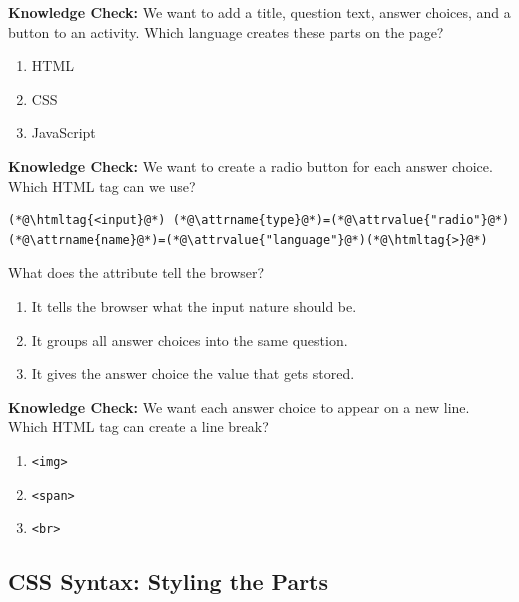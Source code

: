 \documentclass{article}
\begin{document}
\vspace{0.5cm}

\textbf{Knowledge Check:} We want to add a title, question text, answer choices, and a button to an activity. Which language creates these parts on the page?

\begin{enumerate}[label=\Alph*), topsep=4pt, itemsep=2pt, partopsep=0pt]
  \item HTML
  \item CSS
  \item JavaScript
\end{enumerate}

\vspace{0.5cm}

\textbf{Knowledge Check:} We want to create a radio button for each answer choice. Which HTML tag can we use?

\begin{lstlisting}
(*@\htmltag{<input}@*) (*@\attrname{type}@*)=(*@\attrvalue{"radio"}@*) (*@\attrname{name}@*)=(*@\attrvalue{"language"}@*)(*@\htmltag{>}@*)
\end{lstlisting}

What does the  attribute tell the browser?
\begin{enumerate}[label=\Alph*), topsep=4pt, itemsep=2pt, partopsep=0pt]
  \item It tells the browser what the input nature should be.
  \item It groups all answer choices into the same question.
  \item It gives the answer choice the value that gets stored.
\end{enumerate}

\vspace{0.5cm}

\textbf{Knowledge Check:} We want each answer choice to appear on a new line. Which HTML tag can create a line break?

\begin{enumerate}[label=\Alph*), topsep=4pt, itemsep=2pt, partopsep=0pt]
  \item \texttt{<img>}
  \item \texttt{<span>}
  \item \texttt{<br>}
\end{enumerate}

\pagebreak

\subsection*{\Bitter\textcolor{naranja}{CSS Syntax: Styling the Parts}}
\label{subsec:css-syntax}
\end{document}
